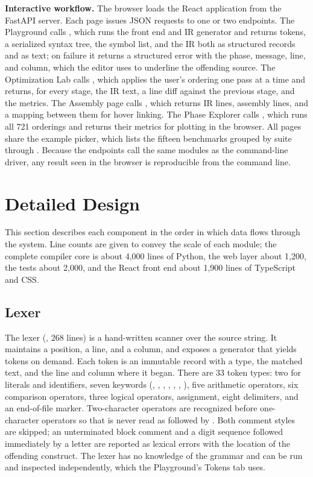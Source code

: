 \textbf{Interactive workflow.} The browser loads the React application from the FastAPI server. Each page issues JSON requests to one or two endpoints. The Playground calls , which runs the front end and IR generator and returns tokens, a serialized syntax tree, the symbol list, and the IR both as structured records and as text; on failure it returns a structured error with the phase, message, line, and column, which the editor uses to underline the offending source. The Optimization Lab calls , which applies the user's ordering one pass at a time and returns, for every stage, the IR text, a line diff against the previous stage, and the metrics. The Assembly page calls , which returns IR lines, assembly lines, and a mapping between them for hover linking. The Phase Explorer calls , which runs all 721 orderings and returns their metrics for plotting in the browser. All pages share the example picker, which lists the fifteen benchmarks grouped by suite through . Because the endpoints call the same modules as the command-line driver, any result seen in the browser is reproducible from the command line.

\section{Detailed Design}

This section describes each component in the order in which data flows through the system. Line counts are given to convey the scale of each module; the complete compiler core is about 4{,}000 lines of Python, the web layer about 1{,}200, the tests about 2{,}000, and the React front end about 1{,}900 lines of TypeScript and CSS.

\subsection{Lexer}

The lexer (, 268 lines) is a hand-written scanner over the source string. It maintains a position, a line, and a column, and exposes a generator that yields tokens on demand. Each token is an immutable record with a type, the matched text, and the line and column where it began. There are 33 token types: two for literals and identifiers, seven keywords (, , , , , , ), five arithmetic operators, six comparison operators, three logical operators, assignment, eight delimiters, and an end-of-file marker. Two-character operators are recognized before one-character operators so that \code{<=} is never read as \code{<} followed by \code{=}. Both comment styles are skipped; an unterminated block comment and a digit sequence followed immediately by a letter are reported as lexical errors with the location of the offending construct. The lexer has no knowledge of the grammar and can be run and inspected independently, which the Playground's Tokens tab uses.

